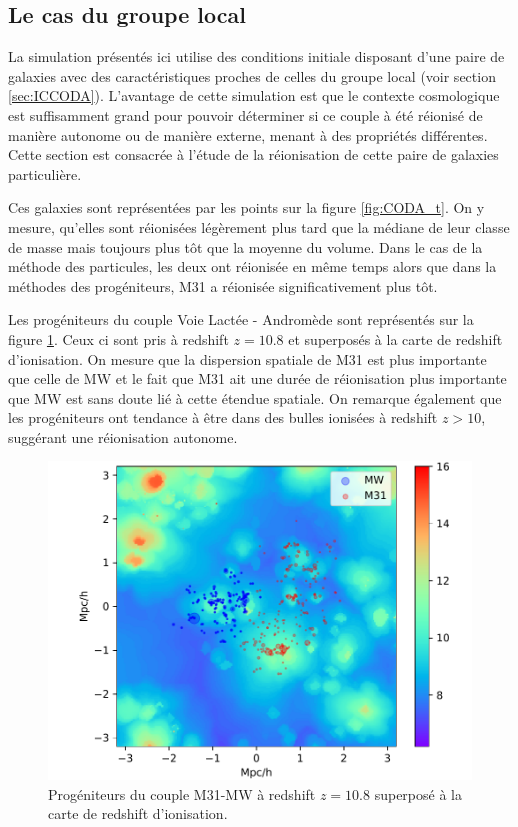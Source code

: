\subsection{Le cas du groupe local}

La simulation présentés ici utilise des conditions initiale disposant d'une paire de galaxies avec des caractéristiques proches de celles du groupe local (voir section \ref{sec:ICCODA}).
L'avantage de cette simulation est que le contexte cosmologique est suffisamment grand pour pouvoir déterminer si ce couple à été réionisé de manière autonome ou de manière externe, menant à des propriétés différentes.
Cette section est consacrée à l'étude de la réionisation de cette paire de galaxies particulière.

Ces galaxies sont représentées par les points sur la figure \ref{fig:CODA_t}. 
On y mesure, qu'elles sont réionisées légèrement plus tard que la médiane de leur classe de masse mais toujours plus tôt que la moyenne du volume.
Dans le cas de la méthode des particules, les deux ont réionisée en même temps alors que dans la méthodes des progéniteurs, M31 a réionisée significativement plus tôt.


Les progéniteurs du couple Voie Lactée - Andromède sont représentés sur la figure \ref{fig:CODA_LG}.
Ceux ci sont pris à redshift $z=10.8$ et superposés à la carte de redshift d'ionisation.
On mesure que la dispersion spatiale de M31 est plus importante que celle de MW et le fait que M31 ait une durée de réionisation plus importante que MW est sans doute lié à cette étendue spatiale.
On remarque également que les progéniteurs ont tendance à être dans des bulles ionisées à redshift $z>10$, suggérant une réionisation autonome.

\begin{figure}
		\centering
		\includegraphics[width=.95\linewidth]{img/05/map_LG.pdf}
        \caption[Réionisation du groupe local]{Progéniteurs du couple M31-MW à redshift $z=10.8$ superposé à la carte de redshift d'ionisation.
		\label{fig:CODA_LG}}
\end{figure}





